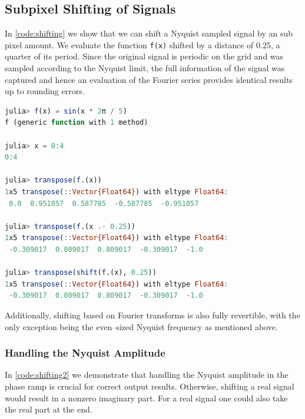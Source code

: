 \documentclass{juliacon}
\def\lc{\lstinline}
\begin{document}
    \subsection{Subpixel Shifting of Signals}
    
    In \autoref{code:shifting} we show that we can shift a Nyquist sampled signal by an sub pixel amount.
    We evaluate the function \lc{f(x)} shifted by a distance of $0.25$, a quarter of its period. Since the original signal is periodic on the grid and was sampled according to the Nyquist limit, the full information
    of the signal was captured and hence an evaluation of the Fourier series provides identical results up to rounding errors. 
    
    
\begin{lstlisting}[language=Julia, label={code:shifting}, caption={Shifting a Nyquist sampled signal by a sub pixel amount.}, captionpos=b]       
julia> f(x) = sin(x * 2π / 5)
f (generic function with 1 method)

julia> x = 0:4
0:4

julia> transpose(f.(x))
1x5 transpose(::Vector{Float64}) with eltype Float64:
 0.0  0.951057  0.587785  -0.587785  -0.951057

julia> transpose(f.(x .- 0.25))
1x5 transpose(::Vector{Float64}) with eltype Float64:
 -0.309017  0.809017  0.809017  -0.309017  -1.0

julia> transpose(shift(f.(x), 0.25))
1x5 transpose(::Vector{Float64}) with eltype Float64:
 -0.309017  0.809017  0.809017  -0.309017  -1.0
\end{lstlisting}        
Additionally, shifting based on Fourier transforms is also fully revertible, with the only exception being the even--sized Nyquist frequency as mentioned above.

\subsubsection{Handling the Nyquist Amplitude}
In \autoref{code:shifting2} we demonstrate that handling the Nyquist amplitude
in the phase ramp is crucial for correct output results.
Otherwise, shifting a real signal would result in a nonzero imaginary part.
For a real signal one could also take the real part at the end.
\end{document}
